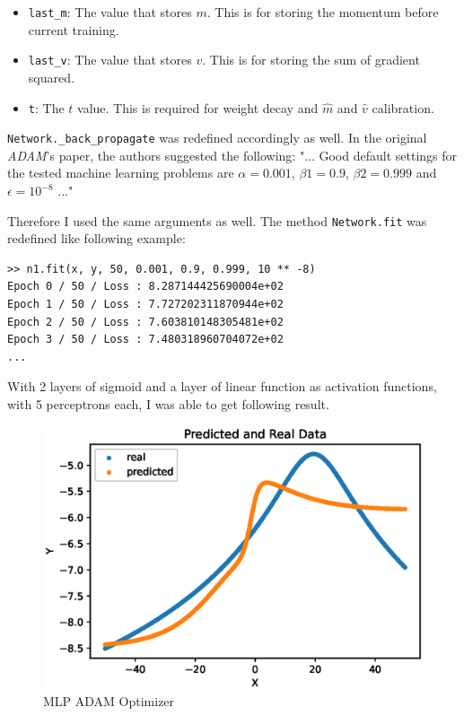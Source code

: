 \documentclass{homework}
\newenvironment{code}{\captionsetup{type=listing}}{}
\begin{document}
\begin{itemize}
    \item \texttt{last_m}: The value that stores $m$. This is for storing the momentum before current training.
    \item \texttt{last_v}: The value that stores $v$. This is for storing the sum of gradient squared.
    \item \texttt{t}: The $t$ value. This is required for weight decay and $\hat{m}$ and $\hat{v}$ calibration. 
\end{itemize}


\texttt{Network._back_propagate} was redefined accordingly as well. In the original \textit{ADAM}'s paper, the authors suggested the following: "... Good default settings for the tested machine learning problems are $\alpha = 0.001$, $\beta1 = 0.9$, $\beta2 = 0.999$ and $\epsilon = 10^{-8}$ ..."

Therefore I used the same arguments as well. The method \texttt{Network.fit} was redefined like following example:
\\
\begin{center}
\begin{code}
\begin{verbatim}
>> n1.fit(x, y, 50, 0.001, 0.9, 0.999, 10 ** -8)
Epoch 0 / 50 / Loss : 8.287144425690004e+02
Epoch 1 / 50 / Loss : 7.727202311870944e+02
Epoch 2 / 50 / Loss : 7.603810148305481e+02
Epoch 3 / 50 / Loss : 7.480318960704072e+02
...
\end{verbatim}
\end{code}
\end{center}

With 2 layers of sigmoid and a layer of linear function as activation functions, with 5 perceptrons each, I was able to get following result.

\pagebreak

\begin{figure}[h]
  \centering
  \includegraphics[scale=0.7]{multilayer_adam_new_1.eps}
  \caption{MLP ADAM Optimizer}
\end{figure}
\end{document}
